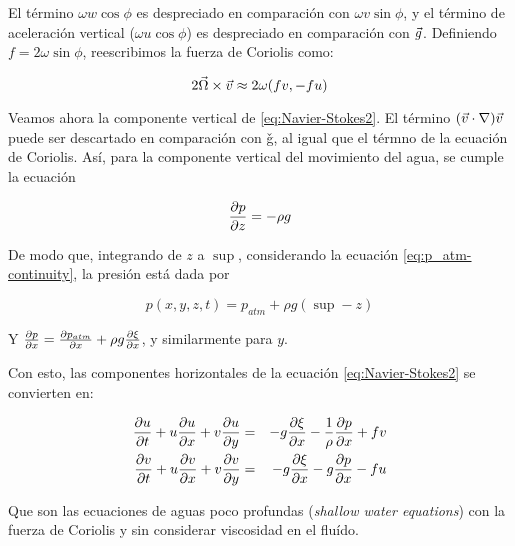 El término $ \omega w \cos \phi$ es despreciado en comparación con $ \omega v \sin \phi$, y el término de aceleración vertical ($ \omega u \cos \phi$) es despreciado en comparación con $\vec{g}$.
Definiendo $f = 2 \omega \sin \phi$, reescribimos la fuerza de Coriolis como:

\begin{equation}
  \label{eq:CoriolisApprox}
  2 \vec{\Omega} \times \vec{v} \approx 2 \omega (fv, -fu)
\end{equation}

Veamos ahora la componente vertical de \eqref{eq:Navier-Stokes2}.
El término $(\vec{v} \cdot \nabla) \vec{v}$ puede ser descartado en comparaci\'on con \v{g}, al igual que el térmno de la ecuación de Coriolis. Así, para la componente vertical del movimiento del agua, se cumple la ecuación

\begin{equation}
  \label{eq:N-S_z_pre}
  \frac{\partial p}{\partial z} = -\rho g
\end{equation}

De modo que, integrando de $z$ a $\sup$, considerando la ecuación \eqref{eq:p_atm-continuity}, la presión está dada por

\begin{equation}
  \label{eq:pressure}
  p(x,y,z,t) = p_{atm}+ \rho g (\sup - z)
\end{equation}

Y $\frac{\partial p}{\partial x} = \frac{\partial p_{atm}}{\partial x} + \rho g \frac{\partial \xi}{\partial x}$, y similarmente para $y$.

Con esto, las componentes horizontales de la ecuación \eqref{eq:Navier-Stokes2} se convierten en:

\begin{eqnarray}
  \label{eq:N-S_x}
  \frac{\partial u}{\partial t} + u \frac{\partial u}{\partial x} + v \frac{\partial u}{\partial y} & = & -g \frac{\partial \xi}{\partial x} -\frac{1}{\rho} \frac{\partial p}{\partial x} + fv \\
  \frac{\partial v}{\partial t} + u \frac{\partial v}{\partial x} + v \frac{\partial v}{\partial y} & = & -g \frac{\partial \xi}{\partial x} -g \frac{\partial p}{\partial x} - fu
\end{eqnarray}

Que son las ecuaciones de aguas poco profundas (\textit{shallow water equations}) con la fuerza de Coriolis y sin considerar viscosidad en el fluído.

%
%
